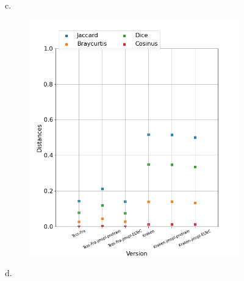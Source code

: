 \begin{figure}
\begin{minipage}{7cm}
\begin{subfigure}{0.99\textwidth}
  \label{fig:Reynolds_DIST_KRAKENBASE_LG}
  \end{subfigure}
  \end{minipage}
\begin{minipage}{7cm}
c.\
  \begin{subfigure}{0.99\textwidth}
  \includegraphics[height=.99\textwidth]{IMAGES/ELTeC_DISTANCES_spaCy3.5.1/DAUDET-graph-dist-spaCy3.5.1-txt.png} 
  \vspace{-0.25cm}
  \label{fig:Daudet_DIST_txt}
  \end{subfigure}
  \end{minipage}
\begin{minipage}{7cm}
d.\
  \begin{subfigure}{0.99\textwidth}

\end{subfigure}
\end{minipage}
\end{figure}
